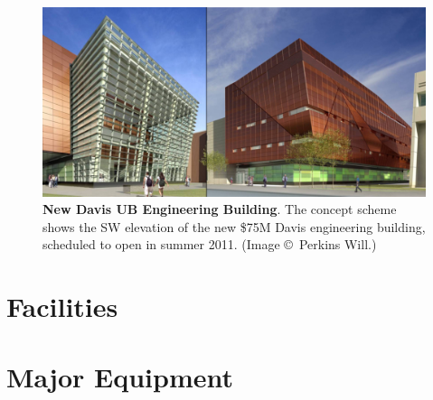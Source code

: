 \thispagestyle{empty}


\begin{figure}[h!]
\centering
\includegraphics[width=\textwidth]{./figures/UBNewBuilding}
\caption{\textbf{New Davis UB Engineering Building}. The concept scheme shows the
SW elevation of the new \$75M Davis engineering building, scheduled to open in
summer 2011. (Image \copyright~Perkins Will.)}
\label{figure-newbuilding}
\end{figure}

\section{Facilities}

%

%

\section{Major Equipment}

